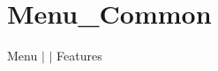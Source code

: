 \chapter{Menu\+\_\+\+Common }
\hypertarget{md__docs_2_common_2_features_2_menu___common}{}\label{md__docs_2_common_2_features_2_menu___common}
Menu \texorpdfstring{$\vert$}{|}  \texorpdfstring{$\vert$}{|} Features



 